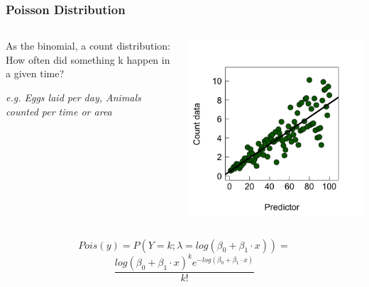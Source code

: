 \documentclass{beamer}
\begin{document}
\begin{frame}
    \frametitle{Poisson Distribution}
    \large
    \begin{columns}
        \begin{column}{0.5\textwidth}
            As the binomial, a count distribution:\\
            How often did something k happen in a given time?
            \vspace{0.2cm}

            \textit{e.g. Eggs laid per day, Animals counted per time or area}
        \end{column}
        \begin{column}{0.5\textwidth}
            \includegraphics[width=\textwidth]{lectures/day_9_refreshing_glm/figures/unnamed-chunk-10-1.png}
        \end{column}
    \end{columns}

    \[
    Pois(y) = P(Y = k; \lambda = log(\beta_0 + \beta_1 \cdot x)) =
    \]
    \[
    \frac{log(\beta_0 + \beta_1 \cdot x)^k e^{-log(\beta_0 + \beta_1 \cdot x)}}{k!}
    \]
\end{frame}
\end{document}
